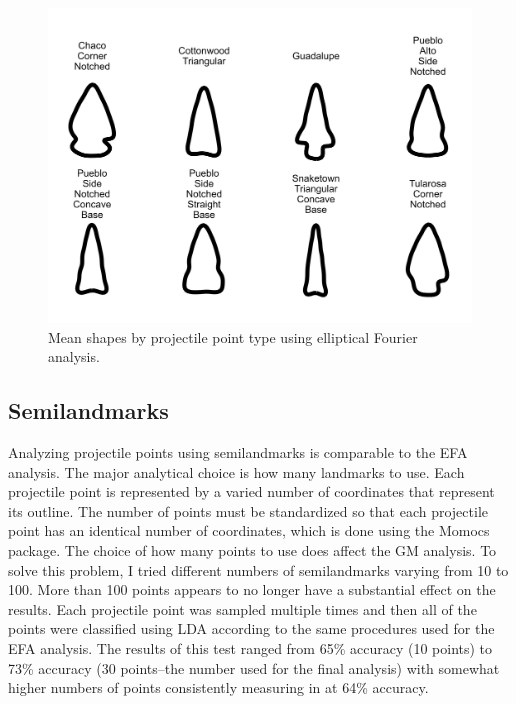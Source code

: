 \documentclass[a4paper]{article}
\begin{document}
\begin{figure}
\includegraphics[width=1\linewidth]{figures/meanShapesEFA} \caption{Mean shapes by projectile point type using elliptical Fourier analysis.}\label{fig:meanShapes}
\end{figure}

\hypertarget{semilandmarks}{%
\subsection*{Semilandmarks}\label{semilandmarks}}

Analyzing projectile points using semilandmarks is comparable to the EFA analysis. The major analytical choice is how many landmarks to use. Each projectile point is represented by a varied number of coordinates that represent its outline. The number of points must be standardized so that each projectile point has an identical number of coordinates, which is done using the Momocs package. The choice of how many points to use does affect the GM analysis. To solve this problem, I tried different numbers of semilandmarks varying from 10 to 100. More than 100 points appears to no longer have a substantial effect on the results. Each projectile point was sampled multiple times and then all of the points were classified using LDA according to the same procedures used for the EFA analysis. The results of this test ranged from 65\% accuracy (10 points) to 73\% accuracy (30 points--the number used for the final analysis) with somewhat higher numbers of points consistently measuring in at 64\% accuracy.
\end{document}
